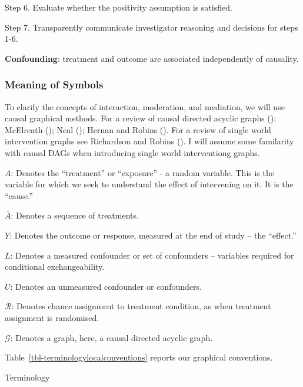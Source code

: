 \documentclass[
  single column]{article}
\begin{document}
Step 6. Evaluate whether the positivity assumption is satisfied.

Step 7. Transparently communicate investigator reasoning and decisions
for steps 1-6.

\textbf{Confounding}: treatment and outcome are associated independently
of causality.

\subsubsection{Meaning of Symbols}\label{meaning-of-symbols}

To clarify the concepts of interaction, moderation, and mediation, we
will use causal graphical methods. For a review of causal directed
acyclic graphs (); McElreath
(); Neal
(); Hernan and Robins
(). For a review of single world
intervention graphs see Richardson and Robins
(). I will assume some
familarity with causal DAGs when introducing single world interventiong
graphs.

\textbf{\(A\)}: Denotes the ``treatment'' or ``exposure'' - a random
variable. This is the variable for which we seek to understand the
effect of intervening on it. It is the ``cause.''

\textbf{\(\bar{A}\)}: Denotes a sequence of treatments.

\textbf{\(Y\)}: Denotes the outcome or response, measured at the end of
study -- the ``effect.''

\textbf{\(L\)}: Denotes a measured confounder or set of confounders --
variables required for conditional exchangeability.

\textbf{\(U\)}: Denotes an unmeasured confounder or confounders.

\textbf{\(\mathcal{R}\)}: Denotes chance assignment to treatment
condition, as when treatment assignment is randomised.

\textbf{\(\mathcal{G}\)}: Denotes a graph, here, a causal directed
acyclic graph.

Table~\ref{tbl-terminologylocalconventions} reports our graphical
conventions.

\begin{table}

\caption{\label{tbl-terminologylocalconventions}Terminology}

\centering{

\terminologylocalconventions

}

\end{table}%
\end{document}
